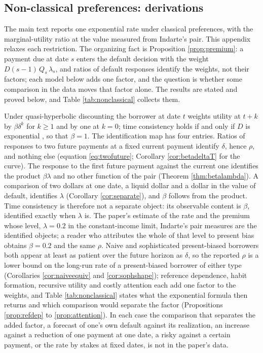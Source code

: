 \documentclass[12pt,english]{article}
\begin{document}
\subsection{Non-classical preferences: derivations}\label{appendix:nonclassical}

The main text reports one exponential rate under classical preferences, with the marginal-utility ratio at the value measured from Indarte's pair. This appendix relaxes each restriction. The organizing fact is Proposition \ref{prop:premium}: a payment due at date $s$ enters the default decision with the weight $D(s-1)\,Q_s\,\lambda_s$, and ratios of default responses identify the weights, not their factors; each model below adds one factor, and the question is whether some comparison in the data moves that factor alone. The results are stated and proved below, and Table \ref{tab:nonclassical} collects them.

Under quasi-hyperbolic discounting \citep{phelps_second-best_1968, laibson_golden_1997} the borrower at date $t$ weights utility at $t+k$ by $\beta\delta^k$ for $k \ge 1$ and by one at $k = 0$; time consistency holds if and only if $D$ is exponential \citep{strotz_myopia_1955}, so that $\beta = 1$. The identification map has four entries. Ratios of responses to two future payments at a fixed current payment identify $\delta$, hence $\rho$, and nothing else (equation \eqref{eq:twofuture}; Corollary \ref{cor:betadeltaT} for the curve). The response to the first future payment against the current one identifies the product $\beta\lambda$ and no other function of the pair (Theorem \ref{thm:betalambda}). A comparison of two dollars at one date, a liquid dollar and a dollar in the value of default, identifies $\lambda$ (Corollary \ref{cor:separate}), and $\beta$ follows from the product. Time consistency is therefore not a separate object: its observable content is $\beta$, identified exactly when $\lambda$ is. The paper's estimate of the rate and the premium whose level, $\lambda = 0.2$ in the constant-income limit, Indarte's pair measures are the identified objects; a reader who attributes the whole of that level to present bias obtains $\beta = 0.2$ and the same $\rho$. Naive and sophisticated present-biased borrowers both appear at least as patient over the future horizon as $\delta$, so the reported $\rho$ is a lower bound on the long-run rate of a present-biased borrower of either type (Corollaries \ref{cor:naiveequiv} and \ref{cor:sophshape}); reference dependence, habit formation, recursive utility and costly attention each add one factor to the weights, and Table \ref{tab:nonclassical} states what the exponential formula then returns and which comparison would separate the factor (Propositions \ref{prop:refdep} to \ref{prop:attention}). In each case the comparison that separates the added factor, a forecast of one's own default against its realization, an increase against a reduction of one payment at one date, a risky against a certain payment, or the rate by stakes at fixed dates, is not in the paper's data.
\end{document}
